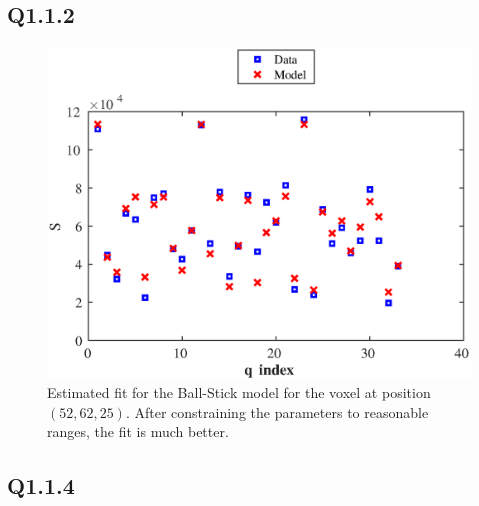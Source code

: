 \documentclass[11pt,a4paper,oneside]{report}
\begin{document}
\subsection*{Q1.1.2}

\begin{figure}[H]
\centering
\includegraphics[scale=0.8]{figures/q1/q112.eps}
\caption{Estimated fit for the Ball-Stick model for the voxel at position $(52,62,25)$. After constraining the parameters to reasonable ranges, the fit is much better.}
\label{q112}
\end{figure}

\subsection*{Q1.1.4}
\end{document}
